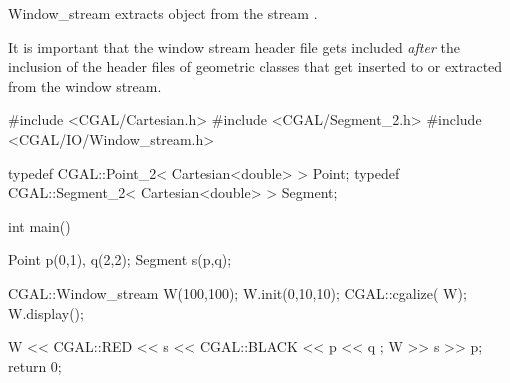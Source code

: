 \begin{ccClass} {Window_stream}
       {extracts object  from the stream \ccVar.}

\ccExample

It is important that the window stream header file gets included
{\em after} the inclusion of the header files of geometric classes
that get inserted to or extracted from the window stream.

\begin{cprog}

#include <CGAL/Cartesian.h>
#include <CGAL/Segment_2.h>
#include <CGAL/IO/Window_stream.h>

typedef CGAL::Point_2< Cartesian<double> >     Point;
typedef CGAL::Segment_2< Cartesian<double> >   Segment;

int main()
{
    Point p(0,1), q(2,2);
    Segment s(p,q);

    CGAL::Window_stream W(100,100);
    W.init(0,10,10);
    CGAL::cgalize( W);
    W.display();

    W << CGAL::RED << s << CGAL::BLACK << p << q ;
    W >> s >> p;
    return 0;
}
\end{cprog} 

\end{ccClass} 
